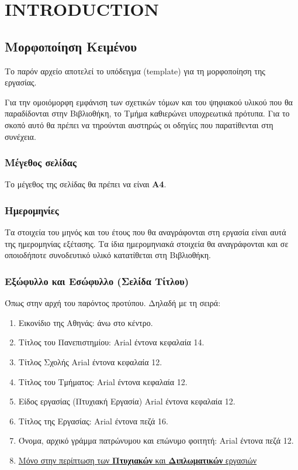 \documentclass[inscr,ack,preface]{dithesis}
\begin{document}
\frontmatter

\mainmatter

\chapter{INTRODUCTION}
  \begin{greek}
    \section{Μορφοποίηση Κειμένου}
    Το παρόν αρχείο αποτελεί το υπόδειγμα (template) για τη μορφοποίηση της εργασίας.

    Για την ομοιόμορφη εμφάνιση των σχετικών τόμων και του ψηφιακού υλικού που θα παραδίδονται στην Βιβλιοθήκη, το Τμήμα καθιερώνει υποχρεωτικά πρότυπα. Για το σκοπό αυτό θα πρέπει να τηρούνται αυστηρώς οι οδηγίες που παρατίθενται στη συνέχεια.

    \subsection{Μέγεθος σελίδας}
    Το μέγεθος της σελίδας θα πρέπει να είναι \textbf{A4}.

    \subsection{Ημερομηνίες}
    Τα στοιχεία του μηνός και του έτους που θα αναγράφονται στη εργασία είναι αυτά της ημερομηνίας εξέτασης. Τα ίδια ημερομηνιακά στοιχεία θα αναγράφονται και σε οποιοδήποτε συνοδευτικό υλικό κατατίθεται στη Βιβλιοθήκη.

    \subsection{Εξώφυλλο και  Εσώφυλλο (Σελίδα Τίτλου)}
    Όπως στην αρχή του παρόντος προτύπου. Δηλαδή με τη σειρά:
    \begin{enumerate}
      \item Εικονίδιο της Αθηνάς: άνω στο κέντρο.
      \item Τίτλος του Πανεπιστημίου: Arial έντονα κεφαλαία 14.
      \item Τίτλος Σχολής Arial έντονα κεφαλαία 12.
      \item Τίτλος του Τμήματος: Arial έντονα κεφαλαία 12.
      \item Είδος εργασίας (Πτυχιακή Εργασία) Arial έντονα κεφαλαία 12.
      \item Τίτλος της Εργασίας: Arial έντονα πεζά 16.
      \item Όνομα, αρχικό γράμμα πατρώνυμου και επώνυμο φοιτητή: Arial έντονα πεζά 12.
      \item \underline{Μόνο στην περίπτωση των \textbf{Πτυχιακών} και \textbf{Διπλωματικών} εργασιών}


\end{enumerate}
\end{greek}
\end{document}
